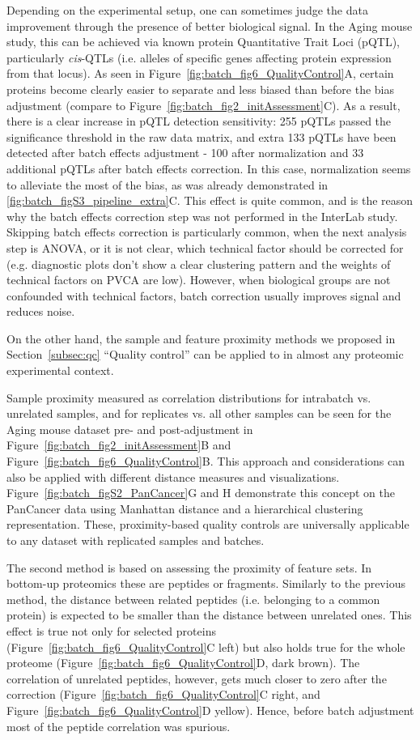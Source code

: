 \documentclass[num-refs]{wiley-article}
\begin{document}
Depending on the experimental setup, one can sometimes judge the data improvement through the presence of better biological signal. In the Aging mouse study, this can be achieved via known protein Quantitative Trait Loci (pQTL), particularly \textit{cis}-QTLs (i.e. alleles of specific genes  affecting protein expression from that locus). As seen in Figure~\ref{fig:batch_fig6_QualityControl}A, certain proteins become clearly easier to separate and less biased than before the bias adjustment (compare to Figure~\ref{fig:batch_fig2_initAssessment}C). As a result, there is a clear increase in pQTL detection sensitivity: 255 pQTLs passed the significance threshold in the raw data matrix, and extra 133 pQTLs have been detected after batch effects adjustment - 100 after normalization and 33 additional pQTLs after batch effects correction. In this case, normalization seems to alleviate the most of the bias, as was already demonstrated in \ref{fig:batch_figS3_pipeline_extra}C. This effect is quite common, and is the reason why the batch effects correction step was not performed in the InterLab study. Skipping batch effects correction is particularly common, when the next analysis step is ANOVA, or it is not clear, which technical factor should be corrected for (e.g. diagnostic plots don't show a clear clustering pattern and the weights of technical factors on PVCA are low).  However, when biological groups are not confounded with technical factors, batch correction usually improves signal and reduces noise.

On the other hand, the sample and feature proximity methods we proposed in Section~\ref{subsec:qc} “Quality control”  can be applied to in almost any proteomic experimental context.

Sample proximity measured as correlation distributions for intrabatch vs. unrelated samples, and for replicates vs. all other samples can be seen for the Aging mouse dataset pre- and post-adjustment in Figure~\ref{fig:batch_fig2_initAssessment}B and Figure~\ref{fig:batch_fig6_QualityControl}B. This approach and considerations can also be applied with different distance measures and visualizations. Figure~\ref{fig:batch_figS2_PanCancer}G and H demonstrate this concept on the PanCancer data using Manhattan distance and a hierarchical clustering representation. These, proximity-based quality controls are universally  applicable to any dataset with replicated samples and batches.

The second method is based on assessing the proximity of feature sets. In bottom-up proteomics these are peptides or fragments. Similarly to the previous method, the distance between related peptides (i.e. belonging to a common protein) is expected to be smaller than the distance between unrelated ones. This effect is true not only for selected proteins (Figure~\ref{fig:batch_fig6_QualityControl}C left) but also holds true for the whole proteome (Figure~\ref{fig:batch_fig6_QualityControl}D, dark brown). The correlation of unrelated peptides, however, gets much closer to zero after the correction (Figure~\ref{fig:batch_fig6_QualityControl}C right, and Figure~\ref{fig:batch_fig6_QualityControl}D yellow). Hence, before batch adjustment most of the peptide correlation was spurious.
\end{document}
